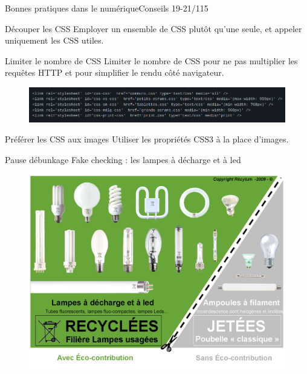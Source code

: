 \begin{frame}{Bonnes pratiques dans le numérique}{Conseils 19-21/115}

\begin{block}{Découper les CSS}
Employer un ensemble de CSS plutôt qu’une seule, et appeler uniquement les CSS utiles.
 \end{block}

\begin{block}{Limiter le nombre de CSS}
Limiter le nombre de CSS pour ne pas multiplier les requêtes HTTP et pour simplifier le rendu côté navigateur.

\begin{figure}
    \centering
    \includegraphics[scale=0.33]{chapitre2/wdd2/fig/codeL.png}
\end{figure}

 \end{block}

\begin{block}{Préférer les CSS aux images}
Utiliser les propriétés CSS3 à la place d’images. 
 \end{block}


 
\end{frame}


\begin{frame}{Pause débunkage }{Fake checking : les lampes à décharge et à led}
\begin{figure}
    \centering
    \includegraphics[scale=0.35]{chapitre2/wdd2/fig/ampoules.png}
\end{figure}

 
\end{frame}

